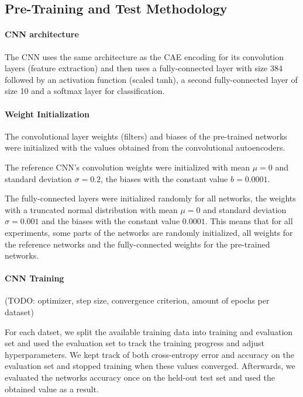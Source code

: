 \documentclass{article}
\begin{document}
  \subsection{Pre-Training and Test Methodology}

    \paragraph{CNN architecture} The CNN uses the same architecture as the CAE encoding for its convolution layers (feature extraction) and then uses a fully-connected layer with size 384 followed by an activation function (scaled tanh), a second fully-connected layer of size 10 and a softmax layer for classification. 

    \paragraph{Weight Initialization}

    The convolutional layer weights (filters) and biases of the pre-trained networks were initialized with the values obtained from the convolutional autoencoders.

    The reference CNN's convolution weights were initialized with mean $\mu = 0 $ and standard deviation $\sigma = 0.2$, the biases with the constant value $b =  0.0001$.

    The fully-connected layers were initialized randomly for all networks, the weights with a truncated normal distribution with mean $\mu = 0$ and standard deviation $\sigma = 0.001$ and the biases with the constant value $0.0001$.
    This means that for all experiments, some parts of the networks are randomly initialized, all weights for the reference networks and the fully-connected weights for the pre-trained networks. 

    \paragraph{CNN Training}
    (TODO: optimizer, step size, convergence criterion, amount of epochs per dataset)

    For each datset, we split the available training data into training and evaluation set and used the evaluation set to track the training progress and adjust hyperparameters. We kept track of both cross-entropy error and accuracy on the evaluation set and stopped training when these values converged. Afterwards, we evaluated the networks accuracy once on the held-out test set and used the obtained value as a result. 
\end{document}
